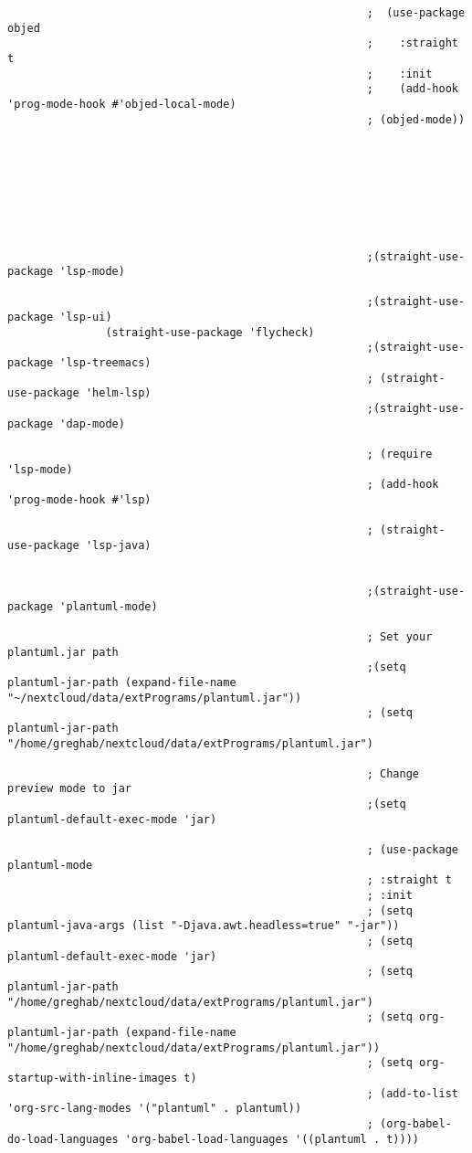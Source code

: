 \documentclass[11pt]{article}
\begin{document}
\begin{verbatim}
                                                       ;  (use-package objed
                                                       ;    :straight t
                                                       ;    :init
                                                       ;    (add-hook 'prog-mode-hook #'objed-local-mode)
                                                       ; (objed-mode))








                                                       ;(straight-use-package 'lsp-mode)

                                                       ;(straight-use-package 'lsp-ui)
               (straight-use-package 'flycheck)
                                                       ;(straight-use-package 'lsp-treemacs)
                                                       ; (straight-use-package 'helm-lsp)
                                                       ;(straight-use-package 'dap-mode)

                                                       ; (require 'lsp-mode)
                                                       ; (add-hook 'prog-mode-hook #'lsp)

                                                       ; (straight-use-package 'lsp-java)


                                                       ;(straight-use-package 'plantuml-mode)

                                                       ; Set your plantuml.jar path
                                                       ;(setq plantuml-jar-path (expand-file-name "~/nextcloud/data/extPrograms/plantuml.jar"))
                                                       ; (setq plantuml-jar-path "/home/greghab/nextcloud/data/extPrograms/plantuml.jar")

                                                       ; Change preview mode to jar
                                                       ;(setq plantuml-default-exec-mode 'jar)

                                                       ; (use-package plantuml-mode
                                                       ; :straight t
                                                       ; :init
                                                       ; (setq plantuml-java-args (list "-Djava.awt.headless=true" "-jar"))
                                                       ; (setq plantuml-default-exec-mode 'jar)
                                                       ; (setq plantuml-jar-path "/home/greghab/nextcloud/data/extPrograms/plantuml.jar")
                                                       ; (setq org-plantuml-jar-path (expand-file-name "/home/greghab/nextcloud/data/extPrograms/plantuml.jar"))
                                                       ; (setq org-startup-with-inline-images t)
                                                       ; (add-to-list 'org-src-lang-modes '("plantuml" . plantuml))
                                                       ; (org-babel-do-load-languages 'org-babel-load-languages '((plantuml . t))))


\end{verbatim}
\end{document}

